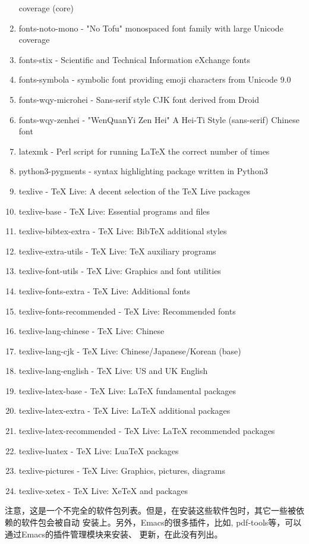 \begin{enumerate}
  coverage (core)
\item fonts-noto-mono - "No Tofu" monospaced font family with large
  Unicode coverage
\item fonts-stix - Scientific and Technical Information eXchange fonts
\item fonts-symbola - symbolic font providing emoji characters from
  Unicode 9.0
\item fonts-wqy-microhei - Sans-serif style CJK font derived from
  Droid
\item fonts-wqy-zenhei - "WenQuanYi Zen Hei" A Hei-Ti Style
  (sans-serif) Chinese font
\item latexmk - Perl script for running LaTeX the correct number of
  times
\item python3-pygments - syntax highlighting package written in Python3
\item texlive - TeX Live: A decent selection of the TeX Live packages
\item texlive-base - TeX Live: Essential programs and files
\item texlive-bibtex-extra - TeX Live: BibTeX additional styles
\item texlive-extra-utils - TeX Live: TeX auxiliary programs
\item texlive-font-utils - TeX Live: Graphics and font utilities
\item texlive-fonts-extra - TeX Live: Additional fonts
\item texlive-fonts-recommended - TeX Live: Recommended fonts
\item texlive-lang-chinese - TeX Live: Chinese
\item texlive-lang-cjk - TeX Live: Chinese/Japanese/Korean (base)
\item texlive-lang-english - TeX Live: US and UK English
\item texlive-latex-base - TeX Live: LaTeX fundamental packages
\item texlive-latex-extra - TeX Live: LaTeX additional packages
\item texlive-latex-recommended - TeX Live: LaTeX recommended packages
\item texlive-luatex - TeX Live: LuaTeX packages
\item texlive-pictures - TeX Live: Graphics, pictures, diagrams
\item texlive-xetex - TeX Live: XeTeX and packages
\end{enumerate}

\vspace{2ex}

注意，这是一个不完全的软件包列表。但是，在安装这些软件包时，其它一些被依赖的软件包会被自动
安装上。另外，Emacs的很多插件，比如\auctex{}, pdf-tools等，可以通过Emacs的插件管理模块来安装、
更新，在此没有列出。


